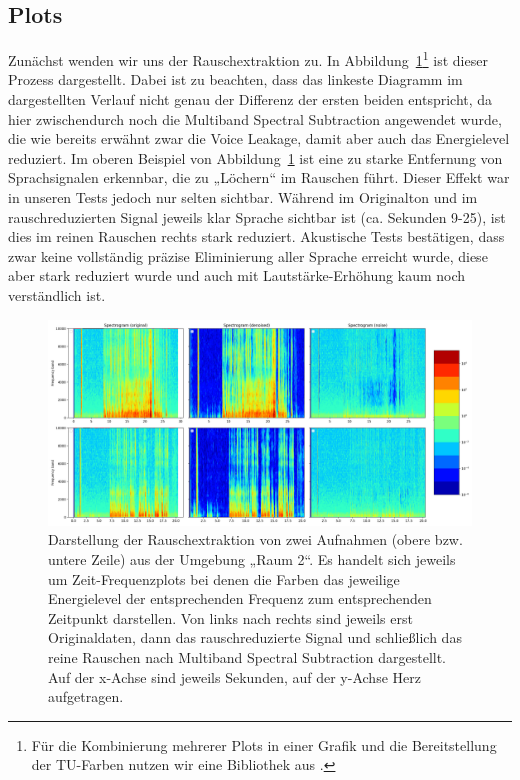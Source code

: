 \documentclass[
	fontsize=10.5pt,
	marginpar=false,
	ngerman,
	accentcolor=3d
	]{tudapub}
\begin{document}
\pagebreak
\subsection{Plots}
\label{plots}

Zunächst wenden wir uns der Rauschextraktion zu. In Abbildung~\ref{fig:denoise}\footnote{Für die Kombinierung mehrerer Plots in einer Grafik und die Bereitstellung der TU-Farben nutzen wir eine Bibliothek aus \cite{damken_fdamkenbachelors-thesis_code_2020}.} ist dieser Prozess dargestellt. Dabei ist zu beachten, dass das linkeste Diagramm im dargestellten Verlauf nicht genau der Differenz der ersten beiden entspricht, da hier zwischendurch noch die Multiband Spectral Subtraction angewendet wurde, die wie bereits erwähnt zwar die Voice Leakage, damit aber auch das Energielevel reduziert. Im oberen Beispiel von Abbildung~\ref{fig:denoise} ist eine zu starke Entfernung von Sprachsignalen erkennbar, die zu „Löchern“ im Rauschen führt. Dieser Effekt war in unseren Tests jedoch nur selten sichtbar. Während im Originalton und im rauschreduzierten Signal jeweils klar Sprache sichtbar ist (ca. Sekunden 9-25), ist dies im reinen Rauschen rechts stark reduziert. Akustische Tests bestätigen, dass zwar keine vollständig präzise Eliminierung aller Sprache erreicht wurde, diese aber stark reduziert wurde und auch mit Lautstärke-Erhöhung kaum noch verständlich ist.

\begin{figure}[h]
	\centering
	\includegraphics[width=1.0\textwidth]{media/denoiser2mp}
	\caption{Darstellung der Rauschextraktion von zwei Aufnahmen (obere bzw. untere Zeile) aus der Umgebung „Raum 2“. Es handelt sich jeweils um Zeit-Frequenzplots bei denen die Farben das jeweilige Energielevel der entsprechenden Frequenz zum entsprechenden Zeitpunkt darstellen. Von links nach rechts sind jeweils erst Originaldaten, dann das rauschreduzierte Signal und schließlich das reine Rauschen nach Multiband Spectral Subtraction dargestellt. Auf der x-Achse sind jeweils Sekunden, auf der y-Achse Herz aufgetragen.}
	\label{fig:denoise}
\end{figure}
\end{document}
